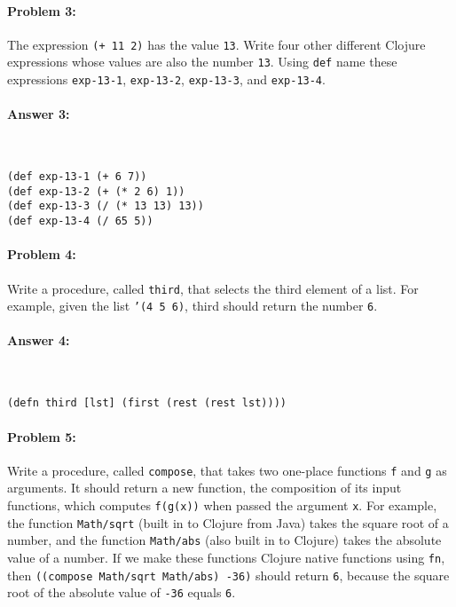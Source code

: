 \documentclass[12pt, letterpaper]{article}
\begin{document}
\hrulefill
\paragraph{Problem 3:}
The expression \texttt{(+ 11 2)} has the value \texttt{13}. Write four
other different Clojure expressions whose values are also the number
\texttt{13}.  Using \texttt{def} name these expressions
\texttt{exp-13-1}, \texttt{exp-13-2}, \texttt{exp-13-3}, and
\texttt{exp-13-4}.

\paragraph{Answer 3:}~\begin{lstlisting}
(def exp-13-1 (+ 6 7))
(def exp-13-2 (+ (* 2 6) 1))
(def exp-13-3 (/ (* 13 13) 13))
(def exp-13-4 (/ 65 5))
\end{lstlisting}

\hrulefill
\paragraph{Problem 4:}
  Write a procedure, called \texttt{third}, that selects the third
  element of a list. For example, given the list \texttt{'(4 5 6)},
  third should return the number \texttt{6}.

\paragraph{Answer 4:}~\begin{lstlisting}
(defn third [lst] (first (rest (rest lst))))
\end{lstlisting}

\hrulefill
\paragraph{Problem 5:}
Write a procedure, called \texttt{compose}, that takes two one-place
functions \texttt{f} and \texttt{g} as arguments. It should return a
new function, the composition of its input functions, which computes
\texttt{f(g(x))} when passed the argument \texttt{x}. For example, the
function \texttt{Math/sqrt} (built in to Clojure from Java) takes the
square root of a number, and the function \texttt{Math/abs} (also
built in to Clojure) takes the absolute value of a number. If we make
these functions Clojure native functions using \texttt{fn}, then
\texttt{((compose Math/sqrt Math/abs) -36)} should return \texttt{6},
because the square root of the absolute value of \texttt{-36} equals
\texttt{6}.
\end{document}
